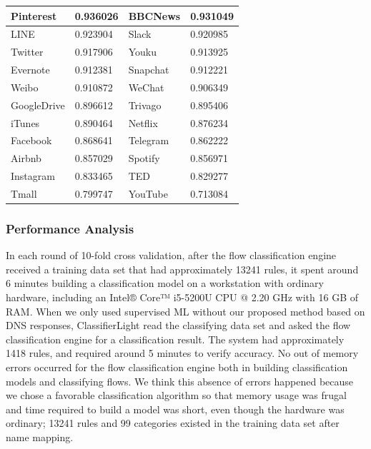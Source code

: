 \documentclass[10pt,journal]{IEEEtran}
\begin{document}
\begin{table}[!t]
\begin{tabular}{|l|l|l|l|}
Pinterest           & 0.936026            & BBCNews           & 0.931049           \\ \hline
LINE                & 0.923904            & Slack             & 0.920985           \\ \hline
Twitter             & 0.917906            & Youku             & 0.913925           \\ \hline
Evernote            & 0.912381            & Snapchat          & 0.912221           \\ \hline
Weibo               & 0.910872            & WeChat            & 0.906349           \\ \hline
GoogleDrive         & 0.896612            & Trivago           & 0.895406           \\ \hline
iTunes              & 0.890464            & Netflix           & 0.876234           \\ \hline
Facebook            & 0.868641            & Telegram          & 0.862222           \\ \hline
Airbnb              & 0.857029            & Spotify           & 0.856971           \\ \hline
Instagram           & 0.833465            & TED               & 0.829277           \\ \hline
Tmall               & 0.799747            & YouTube           & 0.713084           \\ \hline
\end{tabular}
\end{table}

\subsubsection{Performance Analysis}
In each round of 10-fold cross validation, after the flow classification engine received a training data set that had approximately 13241 rules, it spent around 6 minutes building a classification model on a workstation with ordinary hardware, including an Intel® Core™ i5-5200U CPU @ 2.20 GHz with 16 GB of RAM. When we only used supervised ML without our proposed method based on DNS responses, ClassifierLight read the classifying data set and asked the flow classification engine for a classification result. The system had approximately 1418 rules, and required around 5 minutes to verify accuracy. No out of memory errors occurred for the flow classification engine both in building classification models and classifying flows. We think this absence of errors happened because we chose a favorable classification algorithm so that memory usage was frugal and time required to build a model was short, even though the hardware was ordinary; 13241 rules and 99 categories existed in the training data set after name mapping.
\end{document}
